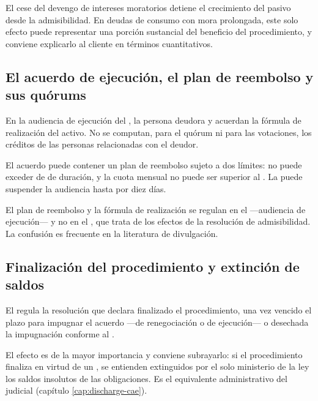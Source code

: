 \begin{practica}
El cese del devengo de intereses moratorios detiene el crecimiento del pasivo desde la
admisibilidad. En deudas de consumo con mora prolongada, este solo efecto puede
representar una porción sustancial del beneficio del procedimiento, y conviene explicarlo
al cliente en términos cuantitativos.
\end{practica}

\subsection{El acuerdo de ejecución, el plan de reembolso y sus quórums}

En la audiencia de ejecución del , la persona deudora y 
acuerdan la fórmula de realización del activo. No se computan, para el quórum ni para las
votaciones, los créditos de las personas relacionadas con el deudor.

El acuerdo puede contener un plan de reembolso sujeto a dos límites: no puede exceder de
 de duración, y la cuota mensual no puede ser superior al
. La \superir{} puede suspender la audiencia
hasta por diez días.

\begin{alerta}
El plan de reembolso y la fórmula de realización se regulan en el  ---audiencia de
ejecución--- y no en el , que trata de los efectos de la resolución de
admisibilidad. La confusión es frecuente en la literatura de divulgación.
\end{alerta}

\subsection{Finalización del procedimiento y extinción de saldos}

El  regula la resolución que declara finalizado el procedimiento, una vez vencido
el plazo para impugnar el acuerdo ---de renegociación o de ejecución--- o desechada la
impugnación conforme al .

El efecto es de la mayor importancia y conviene subrayarlo: si el procedimiento finaliza en
virtud de un , se entienden extinguidos por el solo
ministerio de la ley los saldos insolutos de las obligaciones. Es el equivalente
administrativo del \discharge{} judicial (capítulo \ref{cap:discharge-cae}).

